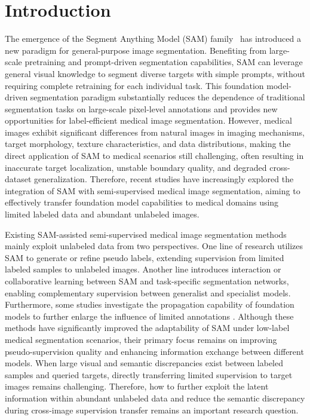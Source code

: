 \documentclass[a4paper,fleqn]{cas-dc}
\begin{document}



\section{Introduction}

The emergence of the Segment Anything Model (SAM) family~\cite{kirillov2023segment, ravi2025sam2, carion2026sam3} has introduced a new paradigm for general-purpose image segmentation. Benefiting from large-scale pretraining and prompt-driven segmentation capabilities, SAM can leverage general visual knowledge to segment diverse targets with simple prompts, without requiring complete retraining for each individual task. This foundation model-driven segmentation paradigm substantially reduces the dependence of traditional segmentation tasks on large-scale pixel-level annotations and provides new opportunities for label-efficient medical image segmentation. However, medical images exhibit significant differences from natural images in imaging mechanisms, target morphology, texture characteristics, and data distributions, making the direct application of SAM to medical scenarios still challenging, often resulting in inaccurate target localization, unstable boundary quality, and degraded cross-dataset generalization. Therefore, recent studies have increasingly explored the integration of SAM with semi-supervised medical image segmentation, aiming to effectively transfer foundation model capabilities to medical domains using limited labeled data and abundant unlabeled images.


Existing SAM-assisted semi-supervised medical image segmentation methods mainly exploit unlabeled data from two perspectives. One line of research utilizes SAM to generate or refine pseudo labels, extending supervision from limited labeled samples to unlabeled images. Another line introduces interaction or collaborative learning between SAM and task-specific segmentation networks, enabling complementary supervision between generalist and specialist models. Furthermore, some studies investigate the propagation capability of foundation models to further enlarge the influence of limited annotations \cite{zhang2025semisamplus,vu2026scsam,xu2024samatch}. Although these methods have significantly improved the adaptability of SAM under low-label medical segmentation scenarios, their primary focus remains on improving pseudo-supervision quality and enhancing information exchange between different models. When large visual and semantic discrepancies exist between labeled samples and queried targets, directly transferring limited supervision to target images remains challenging. Therefore, how to further exploit the latent information within abundant unlabeled data and reduce the semantic discrepancy during cross-image supervision transfer remains an important research question.
\end{document}
